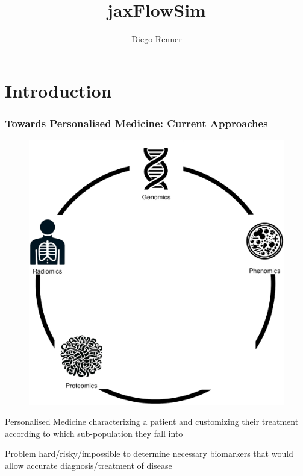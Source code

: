 \documentclass{beamer}
\title{jaxFlowSim}
\author{Diego Renner}
\begin{document}
\section{Introduction}
\maketitle

\begin{frame}
	\frametitle{Towards Personalised Medicine: Current Approaches}
	\begin{minipage}{0.59\textwidth}
		\begin{figure}[H]
			\includegraphics[width=\textwidth]{images/approaches_current.eps}
		\end{figure}
	\end{minipage} 
	\begin{minipage}{0.39\textwidth}
		\begin{block}{Personalised Medicine}
			characterizing a patient and customizing their treatment according to which sub-population they fall into	
		\end{block}
		\begin{block}{Problem}
			hard/risky/impossible to determine necessary biomarkers that would allow accurate diagnosis/treatment of disease
		\end{block}

	\end{minipage}
\end{frame}
\end{document}
